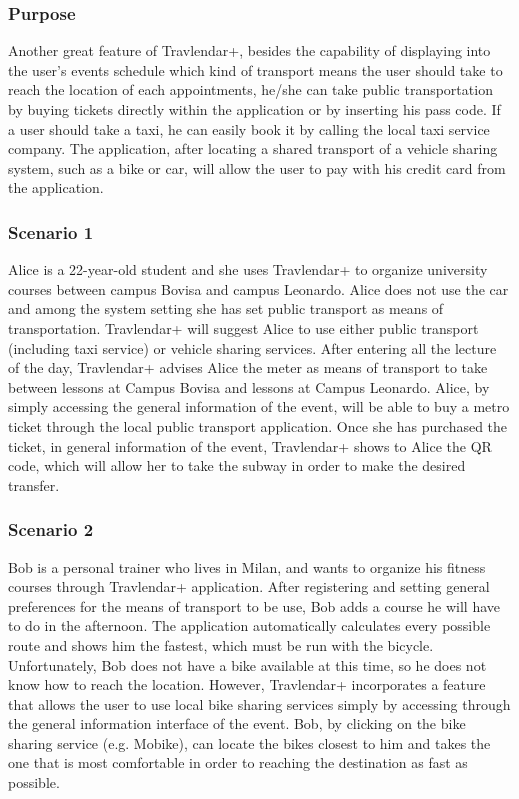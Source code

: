 \subsubsection{Purpose}
Another great feature of Travlendar+, besides the capability of displaying into the user's events schedule which kind of transport means the user should take to reach the location of each appointments, he/she can take public transportation by buying tickets directly within the application or by inserting his pass code. If a user should take a taxi, he can easily book it by calling the local taxi service company. The application, after locating a shared transport of a vehicle sharing system, such as a bike or car, will allow the user to pay with his credit card from the application.

\subsubsection{Scenario 1}
Alice is a 22-year-old student and she uses Travlendar+ to organize university courses between campus Bovisa and campus Leonardo. Alice does not use the car and among the system setting she has set public transport as means of transportation. Travlendar+ will suggest Alice to use either public transport (including taxi service) or vehicle sharing services. After entering all the lecture of the day, Travlendar+ advises Alice the meter as means of transport to take between lessons at Campus Bovisa and lessons at Campus Leonardo.
Alice, by simply accessing the general information of the event, will be able to buy a metro ticket through the local public transport application.
Once she has purchased the ticket, in general information of the event, Travlendar+ shows to Alice the QR code, which will allow her to take the subway in order to make the desired transfer.

\subsubsection{Scenario 2}
Bob is a personal trainer who lives in Milan, and wants to organize his fitness courses through Travlendar+ application.
After registering and setting general preferences for the means of transport to be use, Bob adds a course he will have to do in the afternoon. The application automatically calculates every possible route and shows him the fastest, which must be run with the bicycle. Unfortunately, Bob does not have a bike available at this time, so he does not know how to reach the location.
However, Travlendar+ incorporates a feature that allows the user to use local bike sharing services simply by accessing through the general information interface of the event.
Bob, by clicking on the bike sharing service (e.g. Mobike), can locate the bikes closest to him and takes the one that is most comfortable in order to reaching the destination as fast as possible.

